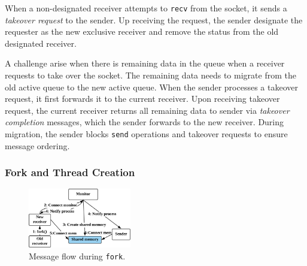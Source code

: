 When a non-designated receiver attempts to \texttt{recv} from the socket, it sends a \textit{takeover request} to the sender. 
Up receiving the request, the sender %
designate the requester as the new exclusive receiver and remove the status from the old designated receiver. 

A challenge arise when there is remaining data in the queue when a receiver requests to take over the socket. %
The remaining data needs to migrate from the old active queue to the new active queue. When the sender processes a takeover request, it first forwards it to the current receiver. Upon receiving takeover request, the current receiver returns all remaining data to sender via \textit{takeover completion} messages, which the sender forwards to the new receiver. During migration, the sender blocks \texttt{send} operations and takeover requests to ensure message ordering.




\subsubsection{Fork and Thread Creation}
\label{subsubsec:fork_fork}


\begin{figure}[t]
	\centering
	\includegraphics[width=0.4\textwidth]{images/fork}
	\vspace{-5pt}
	\caption{Message flow during \texttt{fork}.}
	\label{fig:fork-fork}
	\vspace{-15pt}
\end{figure}


